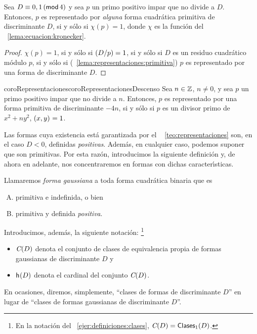 \begin{teoRepresentaciones}\label{teo:representaciones}
	Sea $D\equiv 0,1\tmodulo[4]$ y sea $p$ un primo positivo impar
	que no divide a $D$. Entonces, $p$ es representado
	por \emph{alguna} forma cuadr\'atica primitiva de discriminante
	$D$, si y s\'olo si $\chi(p)=1$, donde $\chi$ es la funci\'on del
	\lemaname~\ref{lema:ecuacion:kronecker}.
\end{teoRepresentaciones}

\begin{proof}
	$\chi(p)=1$, si y s\'olo si $\tlegendre D p=1$, si y s\'olo si
	$D$ es un residuo cuadr\'atico m\'odulo $p$, si y s\'olo si
	(\lemaname~\ref{lema:representaciones:primitiva}) $p$ es
	representado por una forma de discriminante $D$.
\end{proof}

\begin{restatable}{coroRepresentaciones}{coroRepresentacionesDescenso}
	\label{coro:representaciones}
	Sea $n\in\Enteros$, $n\neq 0$, y sea $p$ un primo positivo
	impar que no divide a $n$. Entonces, $p$ es representado
	por una forma primitiva de discriminante $-4n$,
	si y s\'olo si $p$ es un divisor primo de $x^2+ny^2$,
	$\mcd{x,y}=1$.
\end{restatable}

Las formas cuya existencia est\'a garantizada por el \teoname~%
\ref{teo:representaciones} son, en el caso $D<0$, definidas
\emph{positivas}. Adem\'as, en cualquier caso, podemos suponer
que son primitivas. Por esta raz\'on,
introducimos la siguiente definici\'on y,
de ahora en adelante,
nos concentraremos en formas con dichas caracter\'{\i}sticas.

\begin{defRepresentaciones}\label{def:representaciones:gaussianas}
	Llamaremos \emph{forma gaussiana} a toda forma cuadr\'atica
	binaria que es
	\begin{enumerate}[(A)]
		\item primitiva e indefinida, o bien
		\item primitiva y definida \emph{positiva}.
	\end{enumerate}
\end{defRepresentaciones}

Introducimos, adem\'as, la siguiente notaci\'on:%
\footnote{
	En la notaci\'on del \ejername~\ref{ejer:definiciones:clases},
	$\Clases(D)=\varClases[1](D)$.
}
\begin{itemize}
	\item $\Clases(D)$ denota el conjunto de clases de
		equivalencia propia de formas gaussianas de
		discriminante $D$ y
	\item $\nClases(D)$ denota el cardinal del conjunto
		$\Clases(D)$.
\end{itemize}
%
En ocasiones, diremos, simplemente,
``clases de formas de discriminante $D$'' en lugar de
``clases de formas gaussianas de discriminante $D$''.

